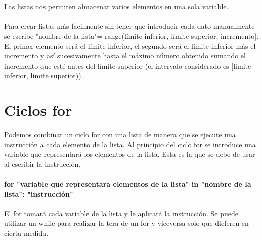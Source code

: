 \documentclass[letterpaper, 12pt, oneside]{article}%
\begin{document}
\\\\
Las listas nos permiten almacenar varios elementos en una sola variable. 
\\\\
Para crear listas más facilmente sin tener que introducir cada dato manualmente se escribe
"nombre de la lista"= range(límite inferior, límite superior, incremento]. El primer elemento será el límite inferior, el segundo será el límite inferior más el incremento y así sucesivamente hasta el máximo número obtenido sumando el incremento que esté antes del límite superior (el intervalo considerado es [limite inferior, límite superior)).

\section{Ciclos for}

Podemos combinar un ciclo for con una lista de manera que se ejecute una instrucción a cada elemento de la lista. Al principio del ciclo for se introduce una variable que representará los elementos de la lista. Esta es la que se debe de usar al escribir la instrucción. 
\\\\
\textbf{for "variable que representara elementos de la lista" in "nombre de la lista":
"instrucción"}
\\\\
El for tomará cada variable de la lista y le aplicará la instrucción. 
Se puede utilizar un while para realizar la tera de un for y viceversa solo que dieferen en cierta medida. 
\end{document}
